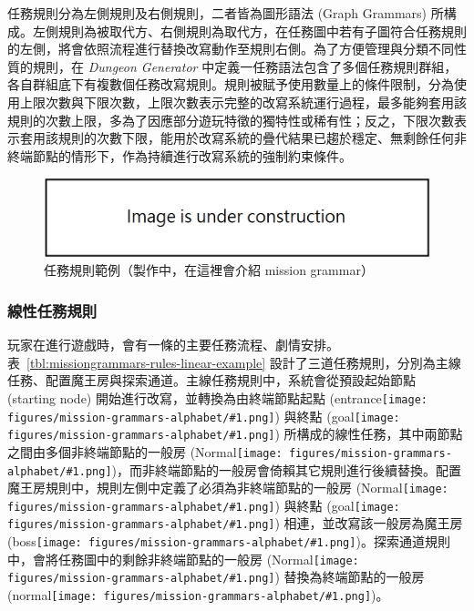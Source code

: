 \newcommand{\alphabetnode}[1]{{\texttt{[image: figures/mission-grammars-alphabet/\#1.png]}}}

任務規則分為左側規則及右側規則，二者皆為圖形語法 (Graph Grammars) 所構成。左側規則為被取代方、右側規則為取代方，在任務圖中若有子圖符合任務規則的左側，將會依照流程進行替換改寫動作至規則右側。為了方便管理與分類不同性質的規則，在 \textit{Dungeon Generator} 中定義一任務語法包含了多個任務規則群組，各自群組底下有複數個任務改寫規則。規則被賦予使用數量上的條件限制，分為使用上限次數與下限次數，上限次數表示完整的改寫系統運行過程，最多能夠套用該規則的次數上限，多為了因應部分遊玩特徵的獨特性或稀有性；反之，下限次數表示套用該規則的次數下限，能用於改寫系統的疊代結果已趨於穩定、無剩餘任何非終端節點的情形下，作為持續進行改寫系統的強制約束條件。

\begin{figure}[!htb]
  \begin{center}
    \includegraphics[width=1.0\textwidth]{figures/under_construction.png}
    \caption{任務規則範例（製作中，在這裡會介紹 mission grammar）}
    \label{fig:missiongrammars-tutorial}
  \end{center}
\end{figure}

\subsubsection{線性任務規則}
\label{sssec:method-missiongrammars-rules-linearrules}

玩家在進行遊戲時，會有一條的主要任務流程、劇情安排。表~\ref{tbl:missiongrammars-rules-linear-example} 設計了三道任務規則，分別為主線任務、配置魔王房與探索通道。主線任務規則中，系統會從預設起始節點 (starting node) 開始進行改寫，並轉換為由終端節點起點 (entrance\alphabetnode{t-entrance}) 與終點 (goal\alphabetnode{t-goal}) 所構成的線性任務，其中兩節點之間由多個非終端節點的一般房 (Normal\alphabetnode{nt-normal})，而非終端節點的一般房會倚賴其它規則進行後續替換。配置魔王房規則中，規則左側中定義了必須為非終端節點的一般房 (Normal\alphabetnode{nt-normal}) 與終點 (goal\alphabetnode{t-goal}) 相連，並改寫該一般房為魔王房 (boss\alphabetnode{t-boss})。探索通道規則中，會將任務圖中的剩餘非終端節點的一般房 (Normal\alphabetnode{nt-normal}) 替換為終端節點的一般房 (normal\alphabetnode{t-normal})。

